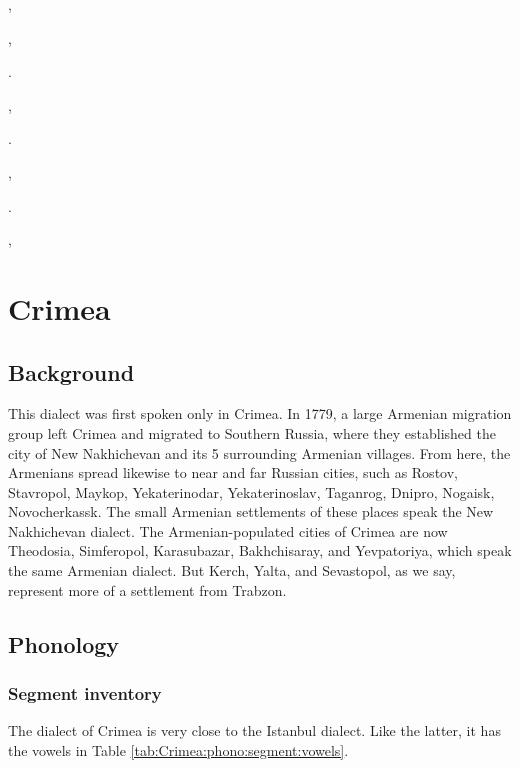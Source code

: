 ,

,


.

,

.

,

.

,



\chapter{Crimea}\label{chapter:Crimea}
\section{Background}

\begin{adjarianpage}\label{page:263}\end{adjarianpage}%

This dialect was first spoken only in Crimea. In 1779, a large Armenian migration group left Crimea and migrated to Southern Russia, where they established the city of New Nakhichevan and its 5 surrounding Armenian villages. From here, the Armenians spread likewise to near and far Russian cities, such as Rostov, Stavropol, Maykop, Yekaterinodar, Yekaterinoslav, Taganrog, Dnipro, Nogaisk, Novocherkassk. The small Armenian settlements of these places speak the New Nakhichevan dialect. The Armenian-populated cities of Crimea are now Theodosia, Simferopol, Karasubazar, Bakhchisaray, and Yevpatoriya, which speak the same Armenian dialect. But Kerch, Yalta, and Sevastopol, as we say, represent more of a settlement from Trabzon. 


\section{Phonology}
\subsection{Segment inventory}
The dialect of Crimea is very close to the Istanbul dialect. Like the latter, it has the vowels in Table \ref{tab:Crimea:phono:segment:vowels}. 



